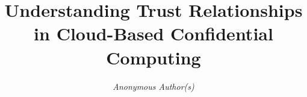\documentclass[compsoc, conference, a4paper, 10pt, times]{IEEEtran}
\begin{document}
\title{Understanding Trust Relationships in Cloud-Based Confidential Computing}




\newcommand{\affiliationkul}{
  \affiliation{
  \department{DistriNet, KU Leuven, Belgium}
  \institution{}
  \country{}
  }
}
\newcommand{\affiliationeab}{
  \affiliation{
  \department{Ericsson Security Research, Sweden}
  \city{}
  \country{}
  }
}
\newcommand{\affiliationulb}{
  \affiliation{
  \department{Universit\'e Libre de Bruxelles, Belgium}
  \country{}
  }
}


\ifdefined\ANON
\author{\em Anonymous Author(s)}
\else

\ifdefined\CAMERAREADY
\makeatletter
\newcommand{\linebreakand}{%
  \end{@IEEEauthorhalign}
  \hfill\mbox{}\par
  \mbox{}\hfill\begin{@IEEEauthorhalign}
}
\makeatother
\end{document}
